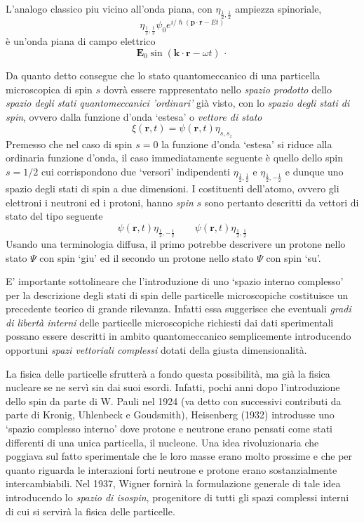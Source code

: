 \begin{marginfigure}
    L'analogo classico piu vicino all'onda piana, con
    \(\eta_{\frac{1}{2}, \frac{1}{2}}\) ampiezza spinoriale,
    \[
        \eta_{\frac{1}{2}, \frac{1}{2}} \psi_{0}e^{ i/\hslash (\bm{p}\cdot \bm{r} - Et)}
    \] è un'onda piana di campo elettrico
    \[
        \bm{E}_{0} \sin(\bm{k}\cdot \bm{r} - \omega t) \, \cdot
    \]
\end{marginfigure}
\bigskip

Da quanto detto consegue che lo stato quantomeccanico di una particella microscopica di spin $s$ dovrà essere rappresentato nello \emph{spazio prodotto} dello \emph{spazio degli stati quantomeccanici 'ordinari’} già visto, con lo \emph{spazio degli stati di spin}, ovvero dalla funzione d’onda ‘estesa’ o \emph{vettore di stato}
\[
\xi(\mathbf{r},t) = \psi(\mathbf{r},t) \eta_{s,s_{z}}
\]
Premesso che nel caso di spin $s=0$ la funzione d’onda ‘estesa’ si riduce alla ordinaria funzione d’onda, il caso immediatamente seguente è quello dello spin $s=1 / 2$ cui corrispondono due ‘versori’ indipendenti $\eta_{\frac{1}{2}, \frac{1}{2}}$ e $\eta_{\frac{1}{2}, - \frac{1}{2}}$ e dunque uno spazio degli stati di spin a due dimensioni. I costituenti dell’atomo, ovvero gli elettroni i neutroni ed i protoni, hanno \emph{spin} $s$ sono pertanto descritti da vettori di stato del tipo seguente
\[
\psi(\mathbf{r},t) \eta_{\frac{1}{2}, - \frac{1}{2}} \qquad \psi(\mathbf{r},t) \eta_{\frac{1}{2}, \frac{1}{2}}
\]
Usando una terminologia diffusa, il primo potrebbe descrivere un protone nello stato $\Psi$ con spin ‘giu’ ed il secondo un protone nello stato $\Psi$ con spin ‘su’.
\bigskip

E’ importante sottolineare che l’introduzione di uno ‘spazio interno complesso’ per la descrizione degli stati di spin delle particelle microscopiche costituisce un precedente teorico di grande rilevanza.
Infatti essa suggerisce che eventuali \emph{gradi di libertà interni} delle particelle microscopiche richiesti dai dati sperimentali possano essere descritti in ambito quantomeccanico semplicemente introducendo opportuni \emph{spazi vettoriali complessi} dotati della giusta dimensionalità.

La fisica delle particelle sfrutterà a fondo questa possibilità, ma già la fisica nucleare se ne servì sin dai suoi esordi.
Infatti, pochi anni dopo l’introduzione dello spin da parte di W. Pauli nel 1924 (va detto con successivi contributi da parte di Kronig, Uhlenbeck e Goudsmith), Heisenberg (1932) introdusse uno ‘spazio complesso interno’ dove protone e neutrone erano pensati come stati differenti di una unica particella, il nucleone.
Una idea rivoluzionaria che poggiava sul fatto sperimentale che le loro masse erano molto prossime e che per quanto riguarda le interazioni forti neutrone e protone erano sostanzialmente intercambiabili.
Nel 1937, Wigner fornirà la formulazione generale di tale idea introducendo lo \emph{spazio di isospin}, progenitore di tutti gli spazi complessi interni di cui si servirà la fisica delle particelle.
\bigskip

